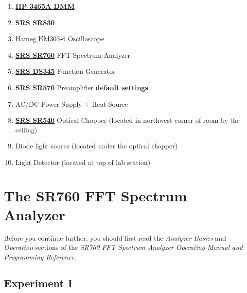 \documentclass{../lab}
\begin{document}
\begin{enumerate}
    \item \href{http://physics111.lib.berkeley.edu/Physics111/Reprints/LLS/11-HP3465A.pdf}{\textbf{HP 3465A DMM}}

    \item \href{http://physics111.lib.berkeley.edu/Physics111/Reprints/LLS/07-SR830.pdf}{\textbf{SRS SR830}}
    
    \item Hameg HM303-6 Oscilloscope

    \item \href{http://physics111.lib.berkeley.edu/Physics111/Reprints/LLS/06-SR760.pdf}{\textbf{SRS SR760}} FFT Spectrum Analyzer

    \item \href{https://youtu.be/PrM8DHFOFS0}{\textbf{SRS DS345}} Function Generator

    \item \href{http://physics111.lib.berkeley.edu/Physics111/Reprints/LLS/05-SR570.pdf}{\textbf{SRS SR570}} Preamplifier \href{http://experimentationlab.berkeley.edu/defaultsettings}{\textbf{default settings}}

    \item AC/DC Power Supply + Heat Source

    \item \href{http://physics111.lib.berkeley.edu/Physics111/Reprints/LLS/10-SR540.pdf}{\textbf{SRS SR540}} Optical Chopper (located in northwest corner of room by the ceiling)

    \item Diode light source (located under the optical chopper)

    \item Light Detector (located at top of lab station)

\end{enumerate}

\section{The SR760 FFT Spectrum Analyzer}

Before you continue further, you should first read the \emph{Analyzer Basics} and \emph{Operation} sections of the \emph{SR760 FFT Spectrum Analyzer Operating Manual and Programming Reference}.

\subsection{Experiment I}
\end{document}
